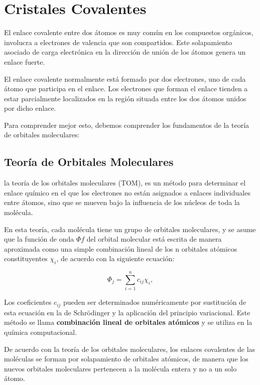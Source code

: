 \documentclass{article}
\begin{document}
\section{Cristales Covalentes}

El enlace covalente entre dos átomos es muy común en los compuestos orgánicos, involucra a electrones de valencia que son compartidos. Este solapamiento asociado de carga electrónica en la dirección de unión de los átomos genera un enlace fuerte. 

El enlace covalente normalmente está formado por dos electrones, uno de cada átomo que participa en el enlace. Los electrones que forman el enlace tienden a estar parcialmente localizados en la región situada entre los dos átomos unidos por dicho enlace. \cite{Hofmann}

Para comprender mejor esto, debemos comprender los fundamentos de la teoría de orbitales moleculares:

\subsection{Teoría de Orbitales Moleculares}

la teoría de los orbitales moleculares (TOM), es un método para determinar el enlace químico en el que los electrones no están asignados a enlaces individuales entre átomos, sino que se mueven bajo la influencia de los núcleos de toda la molécula.

En esta teoría, cada molécula tiene un grupo de orbitales moleculares, y se asume que la función de onda $\Phi f$ del orbital molecular está escrita de manera aproximada como una simple combinación lineal de los n orbitales atómicos constituyentes $\chi_{i}$, de acuerdo con la siguiente ecuación:

\begin{equation}
    \Phi_{j} = \sum_{i=1}^{n} c_{ij}\chi_{i},
\end{equation}

Los coeficientes $c_{ij}$ pueden ser determinados numéricamente por sustitución de esta ecuación en la de Schrödinger y la aplicación del principio variacional. Este método se llama \textbf{combinación lineal de orbitales atómicos} y se utiliza en la química computacional. 

De acuerdo con la teoría de los orbitales moleculares, los enlaces covalentes de las moléculas se forman por solapamiento de orbitales atómicos, de manera que los nuevos orbitales moleculares pertenecen a la molécula entera y no a un solo átomo. 
\end{document}
